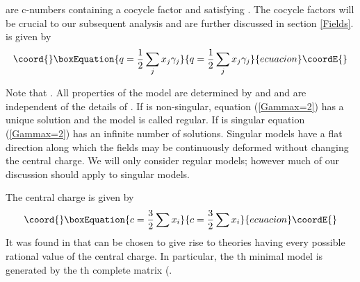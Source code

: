 \documentclass[a4paper,a4paper]{article}
\begin{document}
\coordHE{} are c-numbers containing a cocycle factor and satisfying \coordHE{}.
The cocycle factors will be crucial to our subsequent analysis and are further discussed in section \ref{Fields}.
\coordHE{} is given by
\begin{equation}\coord{}\boxEquation{
q = \frac{1}{2} \sum_j x_j \gamma_j
}{
q = \frac{1}{2} \sum_j x_j \gamma_j
}{ecuacion}\coordE{}\end{equation}

Note that \coordHE{}. All properties of the model are determined by \myHighlight{$\Gamma$}\coordHE{} and \coordHE{}
and are independent of the details of \coordHE{}.  If \myHighlight{$\Gamma$}\coordHE{} is non-singular, equation (\ref{Gammax=2}) has a unique solution
\coordHE{} and the model is called regular. 
If \myHighlight{$\Gamma$}\coordHE{} is singular equation (\ref{Gammax=2}) has an infinite number of solutions. Singular models
have a flat direction along which the fields may be continuously deformed without
changing the central charge.
We will only consider regular models; however much of our discussion should apply to singular models.

The central charge is given by
\begin{equation}\coord{}\boxEquation{
c = \frac{3}{2}\sum x_i
}{
c = \frac{3}{2}\sum x_i
}{ecuacion}\coordE{}\end{equation}
It  was found in \cite{Gepner} that \myHighlight{$\Gamma$}\coordHE{} can be chosen to give rise to 
theories having every possible rational value of the central charge. In
particular, the \coordHE{}th minimal model is generated  by the \coordHE{}th complete \myHighlight{$\Gamma$}\coordHE{} matrix 
(\coordHE{}.
\end{document}
